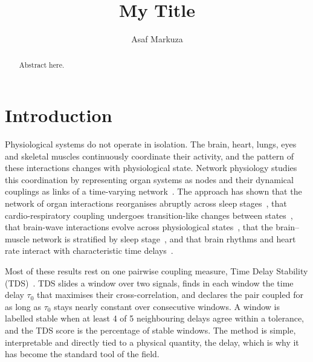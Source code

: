\documentclass[11pt,a4paper]{article}
\title{My Title}
\author{Asaf Markuza}
\date{}
\begin{document}
\maketitle

\begin{abstract}
Abstract here.
\end{abstract}

\section{Introduction}
\label{sec:intro}
Physiological systems do not operate in isolation. The brain, heart, lungs, eyes and skeletal muscles continuously coordinate their activity, and the pattern of these interactions changes with physiological state. Network physiology studies this coordination by representing organ systems as nodes and their dynamical couplings as links of a time-varying network~\cite{Bashan2012NetworkPhysiology,Bartsch2015NetworkPhysiology,Ivanov2021NewField}. The approach has shown that the network of organ interactions reorganises abruptly across sleep stages~\cite{Bashan2012NetworkPhysiology,Bartsch2015NetworkPhysiology}, that cardio-respiratory coupling undergoes transition-like changes between states~\cite{Bartsch2012PhaseTransitions}, that brain-wave interactions evolve across physiological states~\cite{Liu2015PlasticityBrain,Liu2015MajorComponent}, that the brain--muscle network is stratified by sleep stage~\cite{Rizzo2020NetworkPhysiology,Rizzo2022DynamicNetworks}, and that brain rhythms and heart rate interact with characteristic time delays~\cite{Lin2016DelaycorrelationLandscape}.

Most of these results rest on one pairwise coupling measure, Time Delay Stability (TDS)~\cite{Bashan2012NetworkPhysiology,Bartsch2015NetworkPhysiology}. TDS slides a window over two signals, finds in each window the time delay $\tau_0$ that maximises their cross-correlation, and declares the pair coupled for as long as $\tau_0$ stays nearly constant over consecutive windows. A window is labelled stable when at least 4 of 5 neighbouring delays agree within a tolerance, and the TDS score is the percentage of stable windows. The method is simple, interpretable and directly tied to a physical quantity, the delay, which is why it has become the standard tool of the field.
\end{document}
